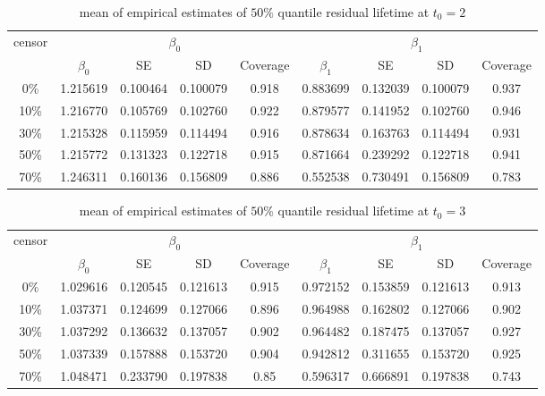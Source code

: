 \documentclass[12pt]{article}
\begin{document}
	\begin{table}[hbt!]
		\caption{mean of empirical estimates of $50\%$ quantile residual lifetime at $t_0=2$}
		\centering
		\begin{tabular}{|c|c|c|c|c|c|c|c|c|}
			\hline
			\multirow{2}{*}{censor} & \multicolumn{4}{c|}{$\beta_0$} & \multicolumn{4}{c|}{$\beta_1$}\\ \cline{2-9}
			& $\beta_0$ & SE & SD  & Coverage  & $\beta_1$ & SE & SD & Coverage\\
			\hline\hline
			0\% & 1.215619 & 0.100464 & 0.100079 & 0.918 & 0.883699 & 0.132039 & 0.100079 & 0.937 \\
			10\% & 1.216770 & 0.105769 & 0.102760 & 0.922 & 0.879577 & 0.141952 & 0.102760 & 0.946 \\
			30\% & 1.215328 & 0.115959 & 0.114494 & 0.916 & 0.878634 & 0.163763 & 0.114494 & 0.931 \\
			50\% & 1.215772 & 0.131323 & 0.122718 & 0.915 & 0.871664 & 0.239292 & 0.122718 & 0.941 \\
			70\% & 1.246311 & 0.160136 & 0.156809 & 0.886 & 0.552538 & 0.730491 & 0.156809 & 0.783 \\ 
			\hline
		\end{tabular}
	\end{table}
	\begin{table}[hbt!]
		\caption{mean of empirical estimates of $50\%$ quantile residual lifetime at $t_0=3$}
		\centering
		\begin{tabular}{|c|c|c|c|c|c|c|c|c|}
			\hline
			\multirow{2}{*}{censor} & \multicolumn{4}{c|}{$\beta_0$} & \multicolumn{4}{c|}{$\beta_1$}\\ \cline{2-9}
			& $\beta_0$ & SE & SD  & Coverage  & $\beta_1$ & SE & SD & Coverage\\
			\hline\hline
			0\% & 1.029616 & 0.120545 & 0.121613 & 0.915& 0.972152 & 0.153859 & 0.121613 & 0.913 \\
			10\% & 1.037371 & 0.124699 & 0.127066 & 0.896 & 0.964988 & 0.162802 & 0.127066 & 0.902 \\
			30\% & 1.037292 & 0.136632 & 0.137057 & 0.902 & 0.964482 & 0.187475 & 0.137057 & 0.927 \\
			50\% & 1.037339 & 0.157888 & 0.153720 & 0.904 & 0.942812 & 0.311655 & 0.153720 & 0.925 \\
			70\% & 1.048471 & 0.233790 & 0.197838 & 0.85 & 0.596317 & 0.666891 & 0.197838 & 0.743 \\ 
			\hline
		\end{tabular}
	\end{table}
\end{document}
